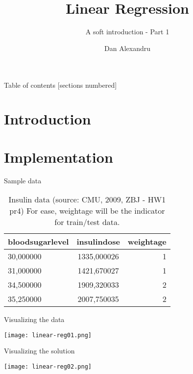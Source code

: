 \documentclass[10pt]{beamer}
\title{Linear Regression}
\subtitle{A soft introduction - Part 1}
\date{}
\author{Dan Alexandru}
\begin{document}
\maketitle

\begin{frame}{Table of contents}
  [sections numbered]
  \tableofcontents[hideallsubsections]
\end{frame}

\section{Introduction}

\section{Implementation}

\begin{frame}{Sample data}
 \begin{table}
    \caption{Insulin data (source: CMU, 2009, ZBJ - HW1 pr4)\break
    For ease, weightage will be the indicator for train/test data.}
    \begin{tabular}{lcr}
      \toprule
      bloodsugarlevel & insulindose & weightage\\
      \midrule
      30,000000 & 1335,000026 & 1\\
      31,000000 & 1421,670027 & 1\\
      34,500000 & 1909,320033 & 2\\
      35,250000 & 2007,750035 & 2\\
      \bottomrule
    \end{tabular}
  \end{table}
\end{frame}
\begin{frame}{Visualizing the data}
  \begin{center}\texttt{[image: linear-reg01.png]}\end{center}
\end{frame}

\begin{frame}{Visualizing the solution}
  \begin{center}\texttt{[image: linear-reg02.png]}\end{center}
\end{frame}
\end{document}
